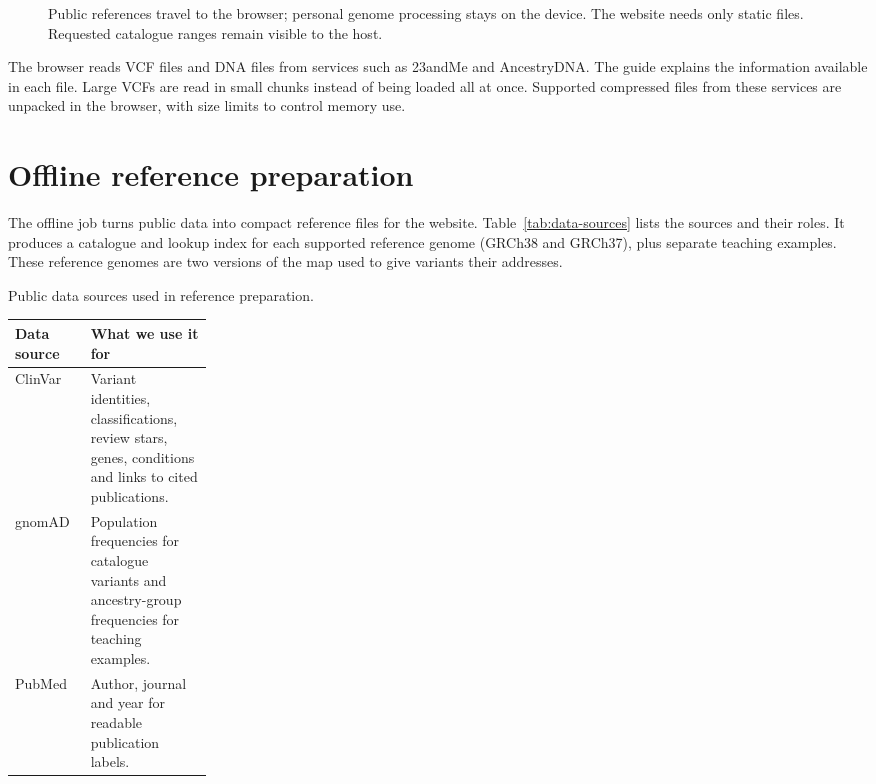 \documentclass[10pt,twocolumn,letterpaper]{article}
\begin{document}
\begin{figure}[t]
\caption{Public references travel to the browser; personal genome processing stays on the device. The website needs only static files. Requested catalogue ranges remain visible to the host.}
\label{fig:architecture}
\end{figure}

The browser reads VCF files and DNA files from services such as 23andMe and AncestryDNA. The guide explains the information available in each file. Large VCFs are read in small chunks instead of being loaded all at once. Supported compressed files from these services are unpacked in the browser, with size limits to control memory use.

\section{Offline reference preparation}
The offline job turns public data into compact reference files for the website. Table~\ref{tab:data-sources} lists the sources and their roles. It produces a catalogue and lookup index for each supported reference genome (GRCh38 and GRCh37), plus separate teaching examples. These reference genomes are two versions of the map used to give variants their addresses.

\par\smallskip\noindent
\begin{minipage}{\columnwidth}
\small
\captionsetup{type=table}
\caption{Public data sources used in reference preparation.}
\label{tab:data-sources}
\begin{tabularx}{\linewidth}{@{}>{\raggedright\arraybackslash}p{0.23\linewidth}>{\raggedright\arraybackslash}X@{}}
\toprule
\textbf{Data source} & \textbf{What we use it for} \\
\midrule
ClinVar~\cite{clinvar} & Variant identities, classifications, review stars, genes, conditions and links to cited publications. \\
\addlinespace
gnomAD~\cite{gnomad} & Population frequencies for catalogue variants and ancestry-group frequencies for teaching examples. \\
\addlinespace
PubMed~\cite{pubmed} & Author, journal and year for readable publication labels. \\
\bottomrule
\end{tabularx}
\end{minipage}
\par\smallskip
\end{document}
